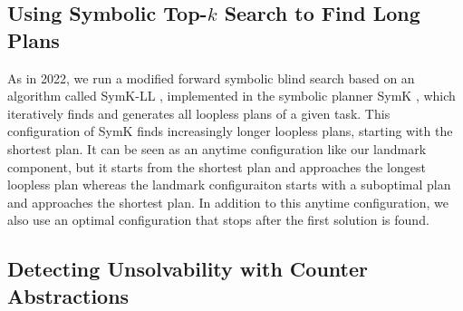 \documentclass{article}
\begin{document}
\subsection{Using Symbolic Top-$k$ Search to Find Long Plans}

As in 2022, we run a modified forward symbolic blind search \cite{torralba-et-al-aij2017,speck-et-al-icaps2020} based on an algorithm called SymK-LL \cite{vontschammer-et-al-icaps2022}, implemented in the symbolic planner SymK \cite{speck-et-al-aaai2020}, which iteratively finds and generates all loopless plans of a given task. This configuration of SymK finds increasingly longer loopless plans, starting with the shortest plan. It can be seen as an anytime configuration like our landmark component, but it starts from the shortest plan and approaches the longest loopless plan whereas the landmark configuraiton starts with a suboptimal plan and approaches the shortest plan. In addition to this anytime configuration, we also use an optimal configuration that stops after the first solution is found.



\subsection{Detecting Unsolvability with Counter Abstractions}
\end{document}
